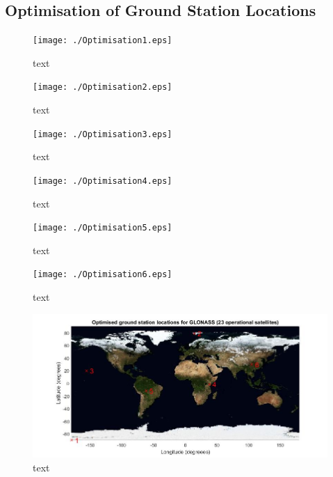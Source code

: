\documentclass[Space3_Assign2]{subfile}
\begin{document}
\subsection{Optimisation of Ground Station Locations}
\begin{figure}
\centering
\caption{text}
\label{Q2op1}
\texttt{[image: ./Optimisation1.eps]}
\end{figure}

\begin{figure}
\centering
\caption{text}
\label{Q2op2}
\texttt{[image: ./Optimisation2.eps]}
\end{figure}
\begin{figure}
\centering
\caption{text}
\label{Q2op3}
\texttt{[image: ./Optimisation3.eps]}
\end{figure}
\begin{figure}
\centering
\caption{text}
\label{Q2op4}
\texttt{[image: ./Optimisation4.eps]}
\end{figure}
\begin{figure}
\centering
\caption{text}
\label{Q2op5}
\texttt{[image: ./Optimisation5.eps]}
\end{figure}
\begin{figure}
\centering
\caption{text}
\label{Q2op6}
\texttt{[image: ./Optimisation6.eps]}
\end{figure}

\begin{figure}
\centering
\caption{text}
\label{GSloc}
\includegraphics[width = \linewidth]{./GSLocations.jpg}
\end{figure}
\end{document}
